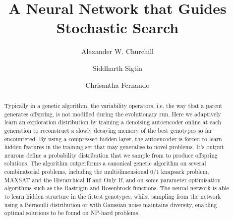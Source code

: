 \documentclass[runningheads,a4paper]{llncs}
\begin{document}
\mainmatter  %

\title{A Neural Network that Guides Stochastic Search}


%
%
\author{Alexander W. Churchill %
%
\and Siddharth Sigtia \and Chrisantha Fernando}
%


%
%

\maketitle


\begin{abstract}
Typically in a genetic algorithm, the variability operators, i.e. the way that a parent generates offspring, is not modified during the evolutionary run. Here we adaptively learn an exploration distribution by training a denoising autoencoder online at each generation to reconstruct a slowly decaying memory of the best genotypes so far encountered. By using a compressed hidden layer, the autoencoder is forced to learn hidden features in the training set that may generalise to novel problems. It's output neurons define a probability distribution that we sample from to produce offspring solutions. The algorithm outperforms a canonical genetic algorithm on several combinatorial problems, including the multidimensional 0/1 knapsack problem, MAXSAT and the Hierarchical If and Only If, and on some parameter optimisation algorithms such as the Rastrigin and Rosenbrock functions. The neural network is able to learn hidden structure in the fittest genotypes, whilst  sampling from the network using a Bernoulli distribution or with Gaussian noise maintains diversity, enabling optimal solutions to be found on NP-hard problems.
\end{abstract}
\end{document}
